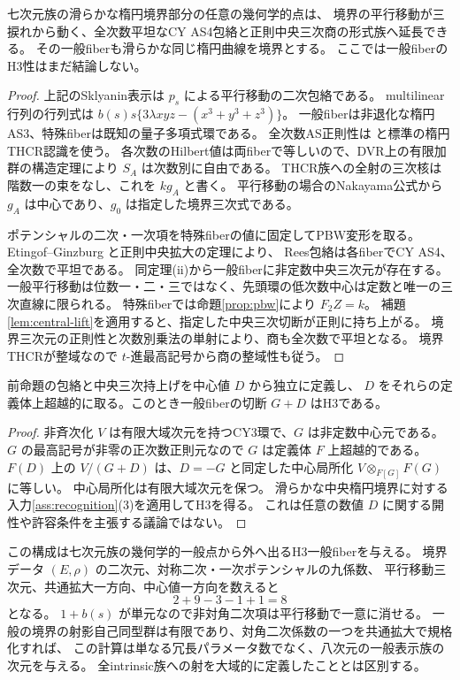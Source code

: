 \begin{proposition}\label{prop:formal-integral}
七次元族の滑らかな楕円境界部分の任意の幾何学的点は、
境界の平行移動が三捩れから動く、全次数平坦なCY AS4包絡と正則中央三次商の形式族へ延長できる。
その一般fiberも滑らかな同じ楕円曲線を境界とする。
ここでは一般fiberのH3性はまだ結論しない。
\end{proposition}
\begin{proof}
上記のSklyanin表示は $p_s$ による平行移動の二次包絡である。
multilinear行列の行列式は
$b(s)s\{3\lambda xyz-(x^3+y^3+z^3)\}$。
一般fiberは非退化な楕円AS3、特殊fiberは既知の量子多項式環である。
全次数AS正則性は \cite{IS} と標準の楕円THCR認識を使う。
各次数のHilbert値は両fiberで等しいので、DVR上の有限加群の構造定理により $S_A$ は次数別に自由である。
THCR族への全射の三次核は階数一の束をなし、これを $kg_A$ と書く。
平行移動の場合のNakayama公式から $g_A$ は中心であり、$g_0$ は指定した境界三次式である。

ポテンシャルの二次・一次項を特殊fiberの値に固定してPBW変形を取る。
Etingof--Ginzburg \cite[Theorem 3.3.2(i)]{EG} と正則中央拡大の定理により、
Rees包絡は各fiberでCY AS4、全次数で平坦である。
同定理(ii)から一般fiberに非定数中央三次元が存在する。
一般平行移動は位数一・二・三ではなく、先頭環の低次数中心は定数と唯一の三次直線に限られる。
特殊fiberでは命題\ref{prop:pbw}により $F_2Z=k$。
補題\ref{lem:central-lift}を適用すると、指定した中央三次切断が正則に持ち上がる。
境界三次元の正則性と次数別乗法の単射により、商も全次数で平坦となる。
境界THCRが整域なので $t$-進最高記号から商の整域性も従う。
\end{proof}

\begin{lemma}[超越的中心値のH3性]\label{lem:generic-D}
前命題の包絡と中央三次持上げを中心値 $D$ から独立に定義し、
$D$ をそれらの定義体上超越的に取る。このとき一般fiberの切断 $G+D$ はH3である。
\end{lemma}
\begin{proof}
非斉次化 $V$ は有限大域次元を持つCY3環で、$G$ は非定数中心元である。
$G$ の最高記号が非零の正次数正則元なので $G$ は定義体 $F$ 上超越的である。
$F(D)$ 上の $V/(G+D)$ は、$D=-G$ と同定した中心局所化
$V\otimes_{F[G]}F(G)$ に等しい。
中心局所化は有限大域次元を保つ。
滑らかな中央楕円境界に対する入力\ref{ass:recognition}(3)を適用してH3を得る。
これは任意の数値 $D$ に関する開性や許容条件を主張する議論ではない。
\end{proof}

この構成は七次元族の幾何学的一般点から外へ出るH3一般fiberを与える。
境界データ $(E,\rho)$ の二次元、対称二次・一次ポテンシャルの九係数、
平行移動三次元、共通拡大一方向、中心値一方向を数えると
\[
2+9-3-1+1=8
\]
となる。
$1+b(s)$ が単元なので非対角二次項は平行移動で一意に消せる。
一般の境界の射影自己同型群は有限であり、対角二次係数の一つを共通拡大で規格化すれば、
この計算は単なる冗長パラメータ数でなく、八次元の一般表示族の次元を与える。
全intrinsic族への射を大域的に定義したこととは区別する。

